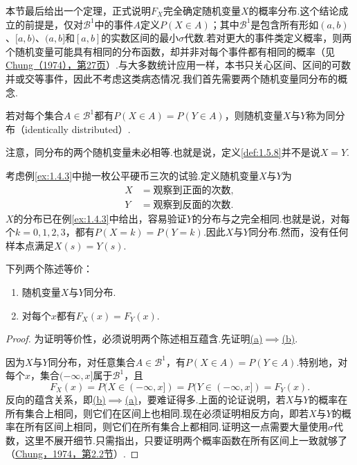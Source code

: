 本节最后给出一个定理，正式说明$F_X$完全确定随机变量$X$的概率分布.这个结论成立的前提是，仅对$\mathscr B^1$中的事件$A$定义$P(X\in A)$；其中$\mathscr B^1$是包含所有形如$(a,b)$、$[a,b)$、$(a,b]$和$[a,b]$的实数区间的最小$\sigma$代数.若对更大的事件类定义概率，则两个随机变量可能具有相同的分布函数，却并非对每个事件都有相同的概率（见\hyperref[bib:source78]{Chung（1974），第27页}）.与大多数统计应用一样，本书只关心区间、区间的可数并或交等事件，因此不考虑这类病态情况.我们首先需要两个随机变量同分布的概念.


\begin{definition}\label{def:1.5.8}
若对每个集合$A\in\mathscr B^1$都有$P(X\in A)=P(Y\in A)$，则随机变量$X$与$Y$称为同分布（identically distributed）.
\end{definition}
注意，同分布的两个随机变量未必相等.也就是说，定义\ref{def:1.5.8}并不是说$X=Y$.

\begin{example}[同分布的随机变量]\label{ex:1.5.9}
考虑例\ref{ex:1.4.3}中抛一枚公平硬币三次的试验.定义随机变量$X$与$Y$为
\begin{equation*}\begin{aligned}
X&=\text{观察到正面的次数},\\
Y&=\text{观察到反面的次数}.
\end{aligned}\end{equation*}
$X$的分布已在例\ref{ex:1.4.3}中给出，容易验证$Y$的分布与之完全相同.也就是说，对每个$k=0,1,2,3$，都有$P(X=k)=P(Y=k)$.因此$X$与$Y$同分布.然而，没有任何样本点满足$X(s)=Y(s)$.
\end{example}

\begin{theorem}\label{thm:1.5.10}
下列两个陈述等价：
\begin{enumerate}[label=\alph*.]
\item\label{item:1.5.10a}随机变量$X$与$Y$同分布.
\item\label{item:1.5.10b}对每个$x$都有$F_X(x)=F_Y(x)$.
\end{enumerate}
\end{theorem}
\begin{proof}
为证明等价性，必须说明两个陈述相互蕴含.先证明\hyperref[item:1.5.10a]{(a)}$\implies$\hyperref[item:1.5.10b]{(b)}.

因为$X$与$Y$同分布，对任意集合$A\in\mathscr B^1$，有$P(X\in A)=P(Y\in A)$.特别地，对每个$x$，集合$(-\infty,x]$属于$\mathscr B^1$，且
$$F_X(x)=P(X\in(-\infty,x])=P(Y\in(-\infty,x])=F_Y(x).$$
反向的蕴含关系，即\hyperref[item:1.5.10b]{(b)}$\implies$\hyperref[item:1.5.10a]{(a)}，要难证得多.上面的论证说明，若$X$与$Y$的概率在所有集合上相同，则它们在区间上也相同.现在必须证明相反方向，即若$X$与$Y$的概率在所有区间上相同，则它们在所有集合上都相同.证明这一点需要大量使用$\sigma$代数，这里不展开细节.只需指出，只要证明两个概率函数在所有区间上一致就够了（\hyperref[bib:source78]{Chung，1974，第2.2节}）.
\end{proof}
